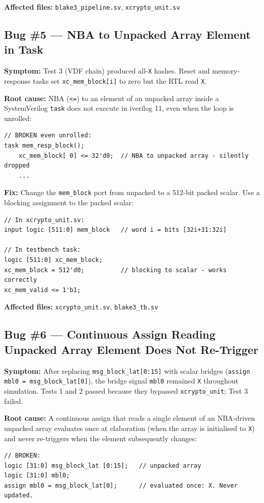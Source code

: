 \documentclass[11pt,a4paper]{article}
\begin{document}
\textbf{Affected files:} \texttt{blake3\_pipeline.sv}, \texttt{xcrypto\_unit.sv}

\subsection{Bug \#5 --- NBA to Unpacked Array Element in Task}

\textbf{Symptom:} Test 3 (VDF chain) produced all-\texttt{X} hashes. Reset
and memory-response tasks set \texttt{xc\_mem\_block[i]} to zero but the RTL
read \texttt{X}.

\textbf{Root cause:} NBA (\texttt{<=}) to an element of an unpacked array inside
a SystemVerilog \texttt{task} does not execute in iverilog 11, even when
the loop is unrolled:
\begin{lstlisting}
// BROKEN even unrolled:
task mem_resp_block();
    xc_mem_block[ 0] <= 32'd0;  // NBA to unpacked array - silently dropped
    ...
\end{lstlisting}

\textbf{Fix:} Change the \texttt{mem\_block} port from unpacked to a 512-bit
packed scalar. Use a blocking assignment to the packed scalar:
\begin{lstlisting}
// In xcrypto_unit.sv:
input logic [511:0] mem_block   // word i = bits [32i+31:32i]

// In testbench task:
logic [511:0] xc_mem_block;
xc_mem_block = 512'd0;          // blocking to scalar - works correctly
xc_mem_valid <= 1'b1;
\end{lstlisting}

\textbf{Affected files:} \texttt{xcrypto\_unit.sv}, \texttt{blake3\_tb.sv}

\subsection{Bug \#6 --- Continuous Assign Reading Unpacked Array Element Does Not Re-Trigger}
\label{bug6}

\textbf{Symptom:} After replacing \texttt{msg\_block\_lat[0:15]} with scalar
bridges (\texttt{assign mbl0 = msg\_block\_lat[0]}), the bridge signal
\texttt{mbl0} remained \texttt{X} throughout simulation. Tests 1 and 2
passed because they bypassed \texttt{xcrypto\_unit}; Test 3 failed.

\textbf{Root cause:} A continuous assign that reads a single element of an
NBA-driven unpacked array evaluates once at elaboration (when the array
is initialised to \texttt{X}) and never re-triggers when the element
subsequently changes:
\begin{lstlisting}
// BROKEN:
logic [31:0] msg_block_lat [0:15];   // unpacked array
logic [31:0] mbl0;
assign mbl0 = msg_block_lat[0];      // evaluated once: X. Never updated.
\end{lstlisting}
\end{document}

